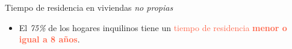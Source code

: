 \documentclass[aspectratio=169]{beamer}
\begin{document}
\begin{frame}{Tiempo de residencia en viviendas \textit{no propias}}
\begin{minipage}{.65\linewidth}
\begin{overlayarea}{\linewidth}{.85\textheight}
            \end{overlayarea}
        \end{minipage}
        \begin{minipage}{.34\linewidth}
            \small
            \setlength{\leftmargini}{8pt}
            \begin{itemize}
                \item<2-> El \textit{75\%} de los hogares inquilinos tiene un \textcolor{tomato}{tiempo de residencia \textbf{menor o igual a 8 años}}.

            \end{itemize}
        \end{minipage}
    \end{frame}
 
\end{document}
